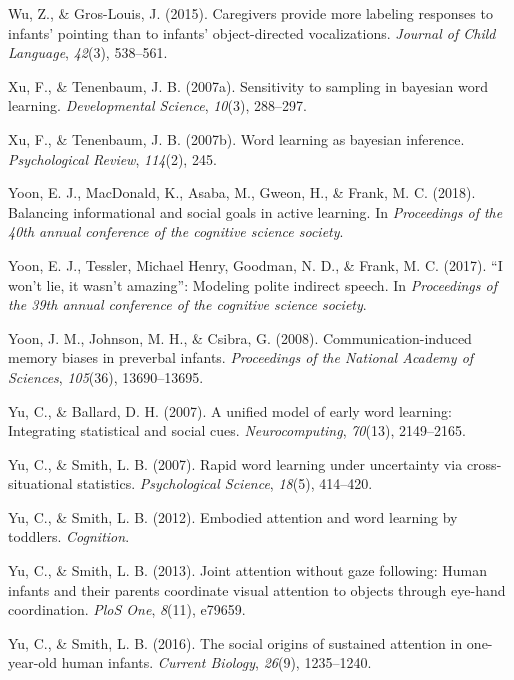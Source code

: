 \documentclass[oneside]{report}
\begin{document}
\hypertarget{ref-wu2015caregivers}{}
Wu, Z., \& Gros-Louis, J. (2015). Caregivers provide more labeling
responses to infants' pointing than to infants' object-directed
vocalizations. \emph{Journal of Child Language}, \emph{42}(3), 538--561.

\hypertarget{ref-xu2007sampling}{}
Xu, F., \& Tenenbaum, J. B. (2007a). Sensitivity to sampling in bayesian
word learning. \emph{Developmental Science}, \emph{10}(3), 288--297.

\hypertarget{ref-xu2007word}{}
Xu, F., \& Tenenbaum, J. B. (2007b). Word learning as bayesian
inference. \emph{Psychological Review}, \emph{114}(2), 245.

\hypertarget{ref-yoon2018balancing}{}
Yoon, E. J., MacDonald, K., Asaba, M., Gweon, H., \& Frank, M. C.
(2018). Balancing informational and social goals in active learning. In
\emph{Proceedings of the 40th annual conference of the cognitive science
society}.

\hypertarget{ref-yoonwon}{}
Yoon, E. J., Tessler, Michael Henry, Goodman, N. D., \& Frank, M. C.
(2017). ``I won't lie, it wasn't amazing'': Modeling polite indirect
speech. In \emph{Proceedings of the 39th annual conference of the
cognitive science society}.

\hypertarget{ref-yoon2008communication}{}
Yoon, J. M., Johnson, M. H., \& Csibra, G. (2008). Communication-induced
memory biases in preverbal infants. \emph{Proceedings of the National
Academy of Sciences}, \emph{105}(36), 13690--13695.

\hypertarget{ref-yu2007unified}{}
Yu, C., \& Ballard, D. H. (2007). A unified model of early word
learning: Integrating statistical and social cues.
\emph{Neurocomputing}, \emph{70}(13), 2149--2165.

\hypertarget{ref-yu2007rapid}{}
Yu, C., \& Smith, L. B. (2007). Rapid word learning under uncertainty
via cross-situational statistics. \emph{Psychological Science},
\emph{18}(5), 414--420.

\hypertarget{ref-yu2012embodied}{}
Yu, C., \& Smith, L. B. (2012). Embodied attention and word learning by
toddlers. \emph{Cognition}.

\hypertarget{ref-yu2013joint}{}
Yu, C., \& Smith, L. B. (2013). Joint attention without gaze following:
Human infants and their parents coordinate visual attention to objects
through eye-hand coordination. \emph{PloS One}, \emph{8}(11), e79659.

\hypertarget{ref-yu2016social}{}
Yu, C., \& Smith, L. B. (2016). The social origins of sustained
attention in one-year-old human infants. \emph{Current Biology},
\emph{26}(9), 1235--1240.
\end{document}
